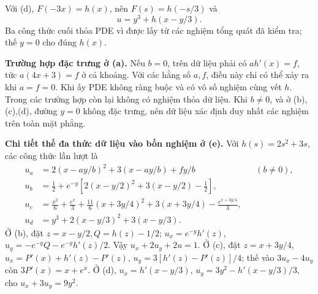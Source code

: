 \documentclass[10pt,a4paper]{article}
\begin{document}
Với (d), $F(-3x)=h(x)$, nên $F(s)=h(-s/3)$ và
\[u=y^3+h(x-y/3).\]
Ba công thức cuối thỏa PDE vì được lấy từ các nghiệm tổng quát đã kiểm tra; thế $y=0$ cho đúng $h(x)$.

\textbf{Trường hợp đặc trưng ở (a).} Nếu $b=0$, trên dữ liệu phải có $ah'(x)=f$, tức $a(4x+3)=f$ ở cả khoảng. Với các hằng số $a,f$, điều này chỉ có thể xảy ra khi $a=f=0$. Khi ấy PDE không ràng buộc và có vô số nghiệm cùng vết $h$. Trong các trường hợp còn lại không có nghiệm thỏa dữ liệu. Khi $b\ne0$, và ở (b),(c),(d), đường $y=0$ không đặc trưng, nên dữ liệu xác định duy nhất các nghiệm trên toàn mặt phẳng.

\textbf{Chi tiết thế đa thức dữ liệu vào bốn nghiệm ở (e).} Với $h(s)=2s^2+3s$, các công thức lần lượt là
\[\begin{aligned}
u_a&=2(x-ay/b)^2+3(x-ay/b)+fy/b &&(b\ne0),\\
u_b&=\tfrac12+e^{-y}[2(x-y/2)^2+3(x-y/2)-\tfrac12],\\
u_c&=\frac{x^2}{6}+\frac{e^x}{3}+\frac{11}{6}(x+3y/4)^2+3(x+3y/4)-\frac{e^{x+3y/4}}3,\\
u_d&=y^3+2(x-y/3)^2+3(x-y/3).
\end{aligned}\]
Ở (b), đặt $z=x-y/2,Q=h(z)-1/2$; $u_x=e^{-y}h'(z)$, $u_y=-e^{-y}Q-e^{-y}h'(z)/2$. Vậy $u_x+2u_y+2u=1$. Ở (c), đặt $z=x+3y/4$, $u_x=P'(x)+h'(z)-P'(z)$, $u_y=3[h'(z)-P'(z)]/4$; thế vào $3u_x-4u_y$ còn $3P'(x)=x+e^x$. Ở (d), $u_x=h'(x-y/3)$, $u_y=3y^2-h'(x-y/3)/3$, cho $u_x+3u_y=9y^2$.
\end{document}
